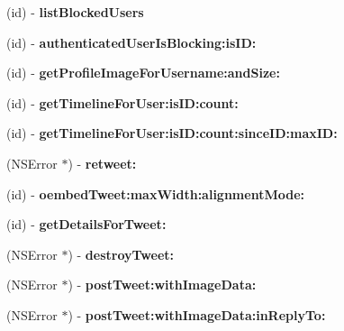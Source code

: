\begin{DoxyCompactItemize}
(id) -\/ {\bfseries list\+Blocked\+Users}
\item 
\mbox{\label{interfaceFHSTwitterEngine_a3307272eefc1193f353f0ee6bd30c29f}} 
(id) -\/ {\bfseries authenticated\+User\+Is\+Blocking\+:is\+I\+D\+:}
\item 
\mbox{\label{interfaceFHSTwitterEngine_a8592523f0d1ae773cba6a3e1b8168078}} 
(id) -\/ {\bfseries get\+Profile\+Image\+For\+Username\+:and\+Size\+:}
\item 
\mbox{\label{interfaceFHSTwitterEngine_a3809735c95bfa94f49802b65e2360c97}} 
(id) -\/ {\bfseries get\+Timeline\+For\+User\+:is\+I\+D\+:count\+:}
\item 
\mbox{\label{interfaceFHSTwitterEngine_a93d6f44bdf88d443e048b18ffa438ef0}} 
(id) -\/ {\bfseries get\+Timeline\+For\+User\+:is\+I\+D\+:count\+:since\+I\+D\+:max\+I\+D\+:}
\item 
\mbox{\label{interfaceFHSTwitterEngine_a8c455d0ad991502c41ec4270c88a646a}} 
(N\+S\+Error $\ast$) -\/ {\bfseries retweet\+:}
\item 
\mbox{\label{interfaceFHSTwitterEngine_a67a1d80f2ae0f3f9b7af3580f32f3fba}} 
(id) -\/ {\bfseries oembed\+Tweet\+:max\+Width\+:alignment\+Mode\+:}
\item 
\mbox{\label{interfaceFHSTwitterEngine_abe7640e54299bee60309d74b640266cf}} 
(id) -\/ {\bfseries get\+Details\+For\+Tweet\+:}
\item 
\mbox{\label{interfaceFHSTwitterEngine_ad48e4f44862e33b033a2223758c089e6}} 
(N\+S\+Error $\ast$) -\/ {\bfseries destroy\+Tweet\+:}
\item 
\mbox{\label{interfaceFHSTwitterEngine_a0e46d83cbf65d9d479833793b353123f}} 
(N\+S\+Error $\ast$) -\/ {\bfseries post\+Tweet\+:with\+Image\+Data\+:}
\item 
\mbox{\label{interfaceFHSTwitterEngine_afc93e4353b5fa4fc26681864c0200249}} 
(N\+S\+Error $\ast$) -\/ {\bfseries post\+Tweet\+:with\+Image\+Data\+:in\+Reply\+To\+:}

\end{DoxyCompactItemize}

